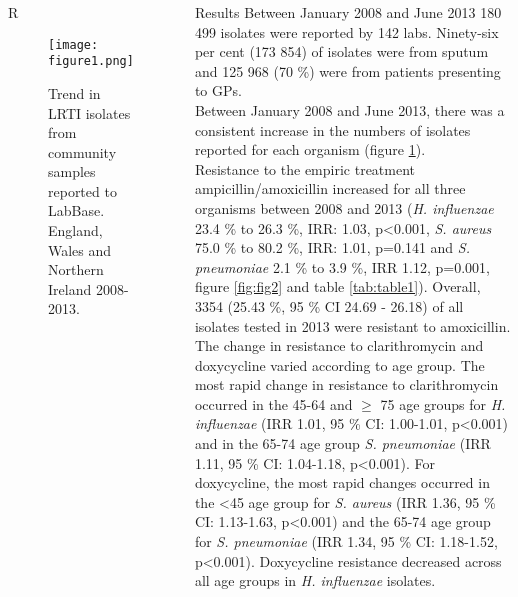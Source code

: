 \documentclass[final, 14pt]{beamer}
\begin{document}
\begin{frame}
\begin{columns}[t]
\begin{minipage}[t]{.95\textwidth}
\begin{block}{\textcolor{comp_blue}{R}}  
    \begin{figure}
   \texttt{[image: figure1.png]}
   \caption{Trend in LRTI isolates from community samples reported to LabBase. England, Wales and Northern Ireland 2008-2013.}
   \label{fig:fig1}
   \end{figure}

\end{block}  
\end{minipage}
  
 \begin{minipage}[t]{.95\textwidth} %
  \begin{block}{Results}
   Between January 2008 and June 2013 180 499 isolates were reported by 142 labs. 
   Ninety-six per cent (173 854) of isolates were from sputum and 125 968 (70 \%) were from patients presenting to GPs. \\
   Between January 2008 and June 2013, there was a consistent increase in the numbers of isolates reported for each organism (figure \ref{fig:fig1}).\\
Resistance to the empiric treatment ampicillin/amoxicillin increased for all three organisms between 2008 and 2013 (\textit{H. influenzae} 23.4 \% to 26.3 \%, IRR: 1.03, p\textless0.001, \textit{S. aureus} 75.0 \% to 80.2 \%, IRR: 1.01, p=0.141 and \textit{S. pneumoniae} 2.1 \% to 3.9 \%, IRR 1.12, p=0.001, figure \ref{fig:fig2} and table \ref{tab:table1}).
   Overall, 3354 (25.43 \%, 95 \% CI 24.69 - 26.18) of all isolates tested in 2013 were resistant to amoxicillin. \\
   The change in resistance to clarithromycin and doxycycline varied according to age group. 
   The most rapid change in resistance to clarithromycin occurred in the 45-64 and $\ge$ 75 age groups for \textit{H. influenzae} (IRR 1.01, 95 \% CI: 1.00-1.01, p\textless0.001) and in the 65-74 age group \textit{S. pneumoniae} (IRR 1.11, 95 \% CI: 1.04-1.18, p\textless0.001). 
   For doxycycline, the most rapid changes occurred in the \textless 45 age group for \textit{S. aureus} (IRR 1.36, 95 \% CI: 1.13-1.63, p\textless0.001) and the 65-74 age group for \textit{S. pneumoniae} (IRR 1.34, 95 \% CI: 1.18-1.52, p\textless0.001). 
   Doxycycline resistance decreased across all age groups in \textit{H. influenzae} isolates.\\

\end{block}
\end{minipage}
\end{columns}
\end{frame}
\end{document}
